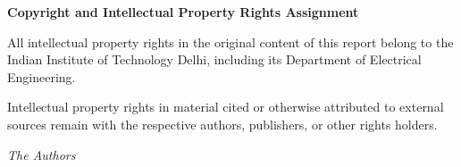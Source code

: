 \clearpage
\thispagestyle{ell305}
\vspace*{0.16\textheight}

\begin{center}
  {\Large\bfseries Copyright and Intellectual Property Rights Assignment\par}
\end{center}

\vspace{1.2cm}

All intellectual property rights in the original content of this report belong to the Indian Institute of Technology Delhi, including its Department of Electrical Engineering.

Intellectual property rights in material cited or otherwise attributed to external sources remain with the respective authors, publishers, or other rights holders.

\vfill

\begin{flushright}
  \textit{The Authors}\\
  \draftdate
\end{flushright}
